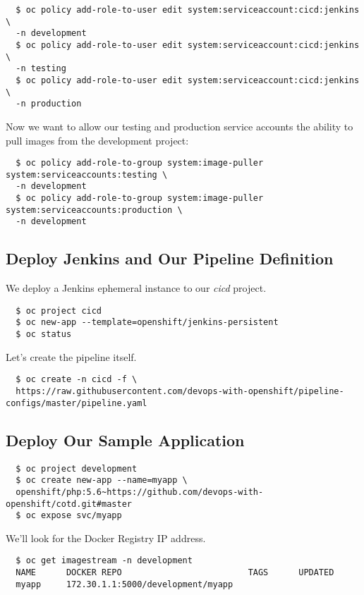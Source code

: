 \begin{verbatim}
  $ oc policy add-role-to-user edit system:serviceaccount:cicd:jenkins \
  -n development
  $ oc policy add-role-to-user edit system:serviceaccount:cicd:jenkins \
  -n testing
  $ oc policy add-role-to-user edit system:serviceaccount:cicd:jenkins \
  -n production
\end{verbatim}

Now we want to allow our testing and production service accounts the ability to pull images from the development project:

\begin{verbatim}
  $ oc policy add-role-to-group system:image-puller system:serviceaccounts:testing \
  -n development
  $ oc policy add-role-to-group system:image-puller system:serviceaccounts:production \
  -n development
\end{verbatim}

\subsection{Deploy Jenkins and Our Pipeline Definition}

We deploy a Jenkins ephemeral instance to our \textit{cicd} project.

\begin{verbatim}
  $ oc project cicd
  $ oc new-app --template=openshift/jenkins-persistent
  $ oc status
\end{verbatim}

Let's create the pipeline itself.

\begin{verbatim}
  $ oc create -n cicd -f \
  https://raw.githubusercontent.com/devops-with-openshift/pipeline-configs/master/pipeline.yaml
\end{verbatim}

\subsection{Deploy Our Sample Application}

\begin{verbatim}
  $ oc project development
  $ oc create new-app --name=myapp \
  openshift/php:5.6~https://github.com/devops-with-openshift/cotd.git#master
  $ oc expose svc/myapp
\end{verbatim}

We'll look for the Docker Registry IP address.

\begin{verbatim}
  $ oc get imagestream -n development
  NAME      DOCKER REPO                         TAGS      UPDATED
  myapp     172.30.1.1:5000/development/myapp 
\end{verbatim}

